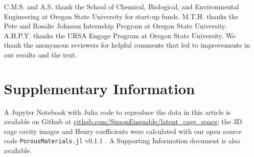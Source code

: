\documentclass[journal=jacsat,manuscript=article,layout=traditional]{achemso}
\begin{document}
\begin{acknowledgement}


C.M.S. and A.S. thank the School of Chemical, Biological, and Environmental Engineering at Oregon State University for start-up funds. M.T.H. thanks the Pete and Rosalie Johnson Internship Program at Oregon State University. A.H.P.Y. thanks the URSA Engage Program at Oregon State University. {\color{red} We thank the anonymous reviewers for helpful comments that led to improvements in our results and the text.}

\end{acknowledgement}



\section{Supplementary Information} A Jupyter Notebook with Julia \cite{julia} code to reproduce the data in this article is available on Github at \url{github.com/SimonEnsemble/latent_cage_space}; the 3D cage cavity images and Henry coefficients were calculated with our open source code \texttt{PorousMaterials.jl} v0.1.1 \cite{PorousMaterialsJL}. A Supporting Information document is also available.


\end{document}
